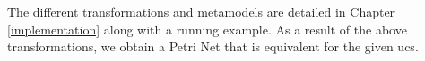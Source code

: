 

The different transformations and metamodels are detailed in Chapter \ref{implementation} along with a running example. As a result of the above transformations, we obtain a Petri Net that is equivalent for the given \gls{ucs}.

\begin{figure}[htb!]
  \centering
   

\end{figure}
